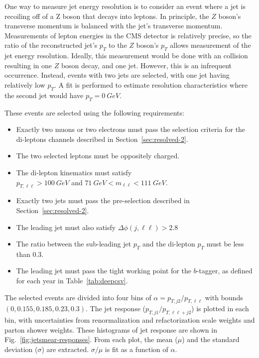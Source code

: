 One way to measure jet energy resolution is to consider an event
where a jet is recoiling off of a Z boson that decays into leptons.
In principle, the $Z$ boson's transverse momentum is balanced with the
jet's transverse momentum.
Measurements of lepton energies in the CMS detector is relatively precise,
so the ratio of the reconstructed jet's
$p_T$ to the $Z$ boson's $p_T$ allows measurement of the jet energy resolution.
Ideally, this measurement would be done with an collision resulting in one $Z$ boson decay,
and one jet.
However, this is an infrequent occurrence.
Instead, events with two jets are selected, with one jet having relatively low $p_T$.
A fit is performed to estimate resolution characteristics
where the second jet would have $p_T = \SI{0}{GeV}$.

These events are selected using the following requirements:

\begin{itemize}
\item Exactly two muons or two electrons must pass the selection criteria for the
  di-leptons channels described in Section~\ref{sec:resolved-2}.
\item The two selected leptons must be oppositely charged.
\item The di-lepton kinematics must satisfy \\ $p_{T,\ell\ell} > \SI{100}{GeV}$ and
  $\SI{71}{GeV} < m_{\ell\ell} < \SI{111}{GeV}$.
\item Exactly two jets must pass the pre-selection described in Section~\ref{sec:resolved-2}.
\item The leading jet must also satisfy $\Delta\phi(j, \ell\ell) > 2.8$
\item The ratio between the sub-leading jet $p_T$ and
  the di-lepton $p_T$ must be less than 0.3.
\item The leading jet must pass the tight working point for the $b$-tagger,
  as defined for each year in Table~\ref{tab:deepcsv}.
\end{itemize}

The selected events are divided into four bins of $\alpha = p_{T,j2}/p_{T, \ell\ell}$
with bounds $(0, 0.155, 0.185, 0.23, 0.3)$.
The jet response ($p_{T, j1}/p_{T, \ell\ell + j2}$) is plotted in each bin,
with uncertainties from renormalization and refactorization scale weights
and parton shower weights.
These histograms of jet response are shown in Fig.~\ref{fig:jetsmear-responses}.
From each plot, the mean ($\mu$) and the standard deviation ($\sigma$) are extracted.
$\sigma/\mu$ is fit as a function of $\alpha$.


